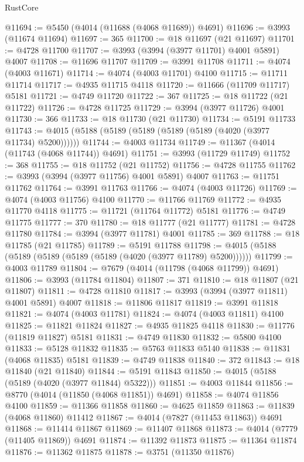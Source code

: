 \begin{lexlean}{RustCore}
\begin{coremodule}
@11694 := @5450 (@4014 (@11688 (@4068 @11689)) @4691)
@11696 := @3993 (@11674 @11694)
@11697 := 365
@11700 := @18 @11697 (@21 @11697)
@11701 := @4728 @11700
@11707 := @3993 (@3994 (@3977 @11701) @4001 @5891) @4007
@11708 := @11696 @11707
@11709 := @3991 @11708
@11711 := @4074 (@4003 @11671)
@11714 := @4074 (@4003 @11701) @4100
@11715 := @11711 @11714
@11717 := @4935 @11715 @4118
@11720 := @11666 (@11709 @11717) @5181
@11721 := @4749 @11720
@11722 := 367
@11725 := @18 @11722 (@21 @11722)
@11726 := @4728 @11725
@11729 := @3994 (@3977 @11726) @4001
@11730 := 366
@11733 := @18 @11730 (@21 @11730)
@11734 := @5191 @11733
@11743 := @4015 (@5188 (@5189 (@5189 (@5189 (@5189 (@4020 (@3977 @11734) @5200))))))
@11744 := @4003 @11734
@11749 := @11367 (@4014 (@11743 (@4068 @11744)) @4691)
@11751 := @3993 (@11729 @11749)
@11752 := 368
@11755 := @18 @11752 (@21 @11752)
@11756 := @4728 @11755
@11762 := @3993 (@3994 (@3977 @11756) @4001 @5891) @4007
@11763 := @11751 @11762
@11764 := @3991 @11763
@11766 := @4074 (@4003 @11726)
@11769 := @4074 (@4003 @11756) @4100
@11770 := @11766 @11769
@11772 := @4935 @11770 @4118
@11775 := @11721 (@11764 @11772) @5181
@11776 := @4749 @11775
@11777 := 370
@11780 := @18 @11777 (@21 @11777)
@11781 := @4728 @11780
@11784 := @3994 (@3977 @11781) @4001
@11785 := 369
@11788 := @18 @11785 (@21 @11785)
@11789 := @5191 @11788
@11798 := @4015 (@5188 (@5189 (@5189 (@5189 (@5189 (@4020 (@3977 @11789) @5200))))))
@11799 := @4003 @11789
@11804 := @7679 (@4014 (@11798 (@4068 @11799)) @4691)
@11806 := @3993 (@11784 @11804)
@11807 := 371
@11810 := @18 @11807 (@21 @11807)
@11811 := @4728 @11810
@11817 := @3993 (@3994 (@3977 @11811) @4001 @5891) @4007
@11818 := @11806 @11817
@11819 := @3991 @11818
@11821 := @4074 (@4003 @11781)
@11824 := @4074 (@4003 @11811) @4100
@11825 := @11821 @11824
@11827 := @4935 @11825 @4118
@11830 := @11776 (@11819 @11827) @5181
@11831 := @4749 @11830
@11832 := @5800 @4100
@11833 := @5128 @11832
@11835 := @5763 @11833 @5140
@11838 := @11831 (@4068 @11835) @5181
@11839 := @4749 @11838
@11840 := 372
@11843 := @18 @11840 (@21 @11840)
@11844 := @5191 @11843
@11850 := @4015 (@5188 (@5189 (@4020 (@3977 @11844) @5322)))
@11851 := @4003 @11844
@11856 := @8770 (@4014 (@11850 (@4068 @11851)) @4691)
@11858 := @4074 @11856 @4100
@11859 := @11366 @11858
@11860 := @4625 @11859
@11863 := @11839 (@4068 @11860) @11412
@11867 := @4014 (@7827 (@11453 @11863)) @4691
@11868 := @11414 @11867
@11869 := @11407 @11868
@11873 := @4014 (@7779 (@11405 @11869)) @4691
@11874 := @11392 @11873
@11875 := @11364 @11874
@11876 := @11362 @11875
@11878 := @3751 (@11350 @11876)

\end{coremodule}
\end{lexlean}
